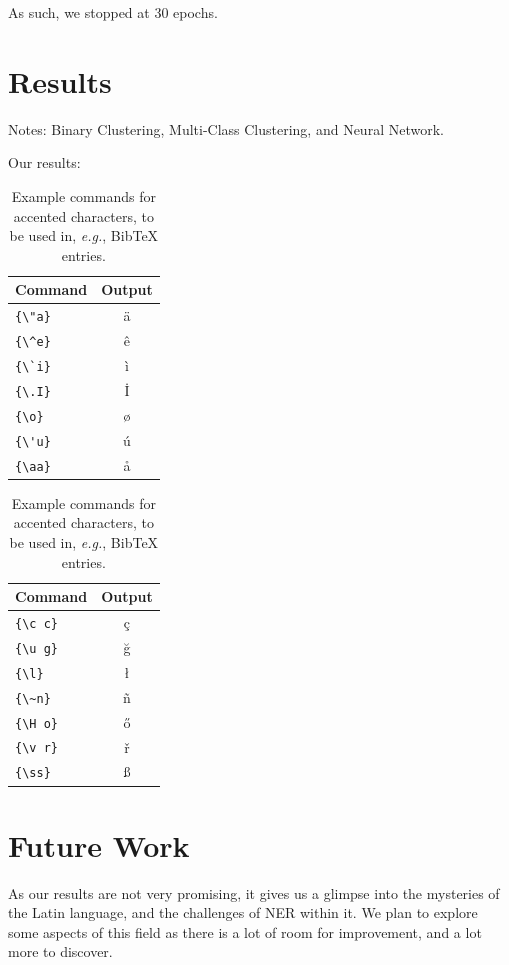 \documentclass[11pt]{article}
\begin{document}
As such, we stopped at 30 epochs.

\section{Results}
Notes: Binary Clustering, Multi-Class Clustering, and Neural Network.

Our results:
\begin{table}[H]
  \centering
  \begin{tabular}{lc}
    \hline
    \textbf{Command} & \textbf{Output} \\
    \hline
    \verb|{\"a}|     & {\"a}           \\
    \verb|{\^e}|     & {\^e}           \\
    \verb|{\`i}|     & {\`i}           \\
    \verb|{\.I}|     & {\.I}           \\
    \verb|{\o}|      & {\o}            \\
    \verb|{\'u}|     & {\'u}           \\
    \verb|{\aa}|     & {\aa}           \\\hline
  \end{tabular}
  \begin{tabular}{lc}
    \hline
    \textbf{Command} & \textbf{Output} \\
    \hline
    \verb|{\c c}|    & {\c c}          \\
    \verb|{\u g}|    & {\u g}          \\
    \verb|{\l}|      & {\l}            \\
    \verb|{\~n}|     & {\~n}           \\
    \verb|{\H o}|    & {\H o}          \\
    \verb|{\v r}|    & {\v r}          \\
    \verb|{\ss}|     & {\ss}           \\
    \hline
  \end{tabular}
  \caption{Example commands for accented characters, to be used in, \emph{e.g.}, Bib\TeX{} entries.}
  \label{tab:accents}
\end{table}

\section{Future Work}

As our results are not very promising, it gives us a glimpse into the mysteries of the Latin language, and the challenges of NER within it.
We plan to explore some aspects of this field as there is a lot of room for improvement, and a lot more to discover.
\end{document}

